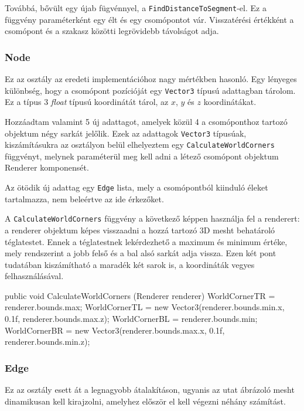 Továbbá, bővült egy újab fügvénnyel, a \texttt{FindDistanceToSegment}-el. Ez a függvény paraméterként egy élt és egy csomópontot vár. Visszatérési értékként a csomópont és a szakasz közötti legrövidebb távolságot adja.

\subsubsection{Node}

Ez az osztály az eredeti implementációhoz nagy mértékben hasonló. Egy lényeges különbség, hogy a csomópont pozícióját egy \texttt{Vector3} típusú adattagban tárolom. Ez a típus 3 \textit{float} típusú koordinátát tárol, az $x$, $y$ és $z$ koordinátákat.

Hozzáadtam valamint 5 új adattagot, amelyek közül 4 a csomóponthoz tartozó objektum négy sarkát jelőlik. Ezek az adattagok \texttt{Vector3} típusúak, kiszámításukra az osztályon belül elhelyeztem egy \texttt{CalculateWorldCorners} függvényt, melynek paraméterül meg kell adni a létező csomópont objektum Renderer komponensét.

Az ötödik új adattag egy \texttt{Edge} lista, mely a csomópontból kiinduló éleket tartalmazza, nem beleértve az ide érkezőket.

A \texttt{CalculateWorldCorners} függvény a következő képpen használja fel a renderert: a renderer objektum képes visszaadni a hozzá tartozó 3D mesht behatároló téglatestet. Ennek a téglatestnek lekérdezhető a maximum és minimum értéke, mely rendszerint a jobb felső és a bal alsó sarkát adja vissza. Ezen két pont tudatában kiszámítható a maradék két sarok is, a koordináták vegyes felhasználásával.
\begin{cpp}
public void CalculateWorldCorners (Renderer renderer)
        {
            WorldCornerTR = renderer.bounds.max;
            WorldCornerTL = new Vector3(renderer.bounds.min.x, 
            0.1f, renderer.bounds.max.z);
            WorldCornerBL = renderer.bounds.min;
            WorldCornerBR = new Vector3(renderer.bounds.max.x,
            0.1f, renderer.bounds.min.z);
        }
\end{cpp}

\subsubsection{Edge}

Ez az osztály esett át a legnagyobb átalakításon, ugyanis az utat ábrázoló mesht dinamikusan kell kirajzolni, amelyhez először el kell végezni néhány számítást.

